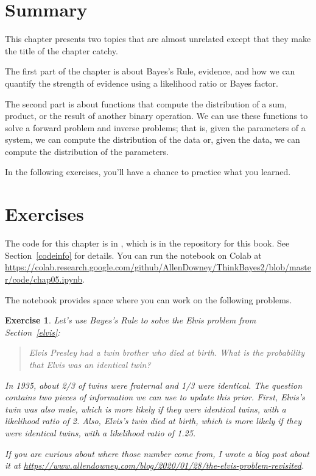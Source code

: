 \documentclass[12pt]{book}
\theoremstyle{exercise}
\newtheorem{exercise}{Exercise}[chapter]
\begin{document}
\section{Summary}

This chapter presents two topics that are almost unrelated except that they make the title of the chapter catchy.

The first part of the chapter is about Bayes's Rule, evidence, and how we can quantify the strength of evidence using a likelihood ratio or Bayes factor.

The second part is about functions that compute the distribution of a sum, product, or the result of another binary operation.
We can use these functions to solve a forward problem and inverse problems; that is, given the parameters of a system, we can compute the distribution of the data or, given the data, we can compute the distribution of the parameters.

In the following exercises, you'll have a chance to practice what you learned.


\section{Exercises}

The code for this chapter is in , which is in the repository for this book.  See Section~\ref{codeinfo} for details.
You can run the notebook on Colab at \url{https://colab.research.google.com/github/AllenDowney/ThinkBayes2/blob/master/code/chap05.ipynb}.

The notebook provides space where you can work on the following problems.


\begin{exercise}
Let's use Bayes's Rule to solve the Elvis problem from Section~\ref{elvis}:

\begin{quote}
Elvis Presley had a twin brother who died at birth. What is the probability that Elvis was an identical twin?
\end{quote}

In 1935, about 2/3 of twins were fraternal and 1/3 were identical.
The question contains two pieces of information we can use to update this prior.
First, Elvis's twin was also male, which is more likely if they were identical twins, with a likelihood ratio of 2.
Also, Elvis's twin died at birth, which is more likely if they were identical twins, with a likelihood ratio of 1.25.

If you are curious about where those number come from, I wrote a blog post about it at \url{https://www.allendowney.com/blog/2020/01/28/the-elvis-problem-revisited}.
\end{exercise}
\end{document}
